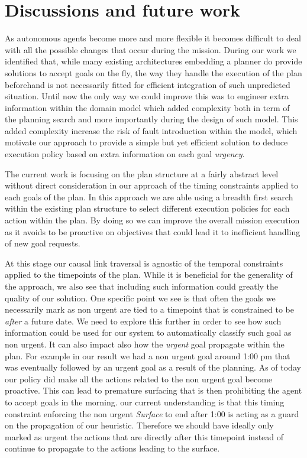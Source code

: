 \section{Discussions and future work}
\label{sec:conclude}

As autonomous agents become more and more flexible it becomes difficult
to deal with all the possible changes that occur during the
mission. During our work we identified that, while many existing 
architectures embedding a planner do provide solutions to accept goals
on the fly, the way they handle the execution of the plan beforehand
is not necessarily fitted for efficient integration of such unpredicted
situation. Until now the only way we could improve this was to engineer
extra information within the domain model which added complexity both in
term of the planning search and more importantly during the design of
such model. This added complexity increase the risk of fault
introduction within the model, which motivate our approach to provide 
a simple but yet efficient solution to deduce execution policy based
on extra information on each goal {\em urgency}.

The current work is focusing on the plan structure at a fairly
abstract level without direct consideration in our approach of the
timing constraints applied to each goals of the plan. In this approach
we are able using a breadth first search within the existing plan
structure to select different execution policies for each action
within the plan. By doing so we can improve the overall mission 
execution as it avoids to be proactive on objectives that could lead it
to inefficient handling of new goal requests.

At this stage our causal link traversal is agnostic of the temporal 
constraints applied to the timepoints of the plan. While it is
beneficial for the generality of the approach, we also see that
including such information could greatly the quality of our solution. 
One specific point we see is that often the goals we necessarily mark
as non urgent are tied to a timepoint that is constrained to be {\em
  after} a future date. We need to explore this further in order to
see how such information could be used for our system to automatically
classify such goal as non urgent. It can also impact  also how the
{\em urgent} goal propagate within the plan. For example in our result
we had a non urgent goal around 1:00 pm that was eventually 
followed by an urgent goal as a result of the planning. As of today 
our policy did make all the actions related to the non urgent goal 
become proactive. This can lead to premature surfacing that is then 
prohibiting the agent to accept goals in the morning. our current
understanding is that this timing constraint enforcing the non
urgent {\em Surface} to end after 1:00 is acting as a guard on the
propagation of our heuristic. Therefore we should have ideally only
marked as urgent the actions that are directly after this timepoint
instead of continue to propagate to the actions leading to the
surface. 

